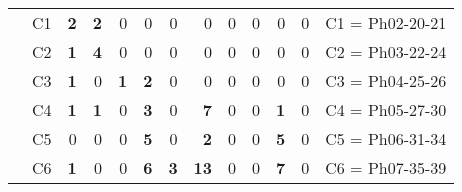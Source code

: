 \begin{table}[H]
{\begin{tabular}{|ccrrrrrrrrrrc|}
\multicolumn{1}{|c|}{}                                      & \multicolumn{1}{c|}{C1} & \multicolumn{1}{r|}{\textbf{2}} & \multicolumn{1}{r|}{\textbf{2}} & \multicolumn{1}{r|}{0}          & \multicolumn{1}{r|}{0}          & \multicolumn{1}{r|}{0}          & \multicolumn{1}{r|}{0}           & \multicolumn{1}{r|}{0}          & \multicolumn{1}{r|}{0}  & \multicolumn{1}{r|}{0}           & \multicolumn{1}{r|}{0}          & C1 = Ph02-20-21   \\ \cline{2-13}
\multicolumn{1}{|c|}{}                                      & \multicolumn{1}{c|}{C2} & \multicolumn{1}{r|}{\textbf{1}} & \multicolumn{1}{r|}{\textbf{4}} & \multicolumn{1}{r|}{0}          & \multicolumn{1}{r|}{0}          & \multicolumn{1}{r|}{0}          & \multicolumn{1}{r|}{0}           & \multicolumn{1}{r|}{0}          & \multicolumn{1}{r|}{0}  & \multicolumn{1}{r|}{0}           & \multicolumn{1}{r|}{0}          & C2 = Ph03-22-24   \\ \cline{2-13}
\multicolumn{1}{|c|}{}                                      & \multicolumn{1}{c|}{C3} & \multicolumn{1}{r|}{\textbf{1}} & \multicolumn{1}{r|}{0}          & \multicolumn{1}{r|}{\textbf{1}} & \multicolumn{1}{r|}{\textbf{2}} & \multicolumn{1}{r|}{0}          & \multicolumn{1}{r|}{0}           & \multicolumn{1}{r|}{0}          & \multicolumn{1}{r|}{0}  & \multicolumn{1}{r|}{0}           & \multicolumn{1}{r|}{0}          & C3 = Ph04-25-26   \\ \cline{2-13}
\multicolumn{1}{|c|}{}                                      & \multicolumn{1}{c|}{C4} & \multicolumn{1}{r|}{\textbf{1}} & \multicolumn{1}{r|}{\textbf{1}} & \multicolumn{1}{r|}{0}          & \multicolumn{1}{r|}{\textbf{3}} & \multicolumn{1}{r|}{0}          & \multicolumn{1}{r|}{\textbf{7}}  & \multicolumn{1}{r|}{0}          & \multicolumn{1}{r|}{0}  & \multicolumn{1}{r|}{\textbf{1}}  & \multicolumn{1}{r|}{0}          & C4 = Ph05-27-30   \\ \cline{2-13}
\multicolumn{1}{|c|}{}                                      & \multicolumn{1}{c|}{C5} & \multicolumn{1}{r|}{0}          & \multicolumn{1}{r|}{0}          & \multicolumn{1}{r|}{0}          & \multicolumn{1}{r|}{\textbf{5}} & \multicolumn{1}{r|}{0}          & \multicolumn{1}{r|}{\textbf{2}}  & \multicolumn{1}{r|}{0}          & \multicolumn{1}{r|}{0}  & \multicolumn{1}{r|}{\textbf{5}}  & \multicolumn{1}{r|}{0}          & C5 = Ph06-31-34   \\ \cline{2-13}
\multicolumn{1}{|c|}{}                                      & \multicolumn{1}{c|}{C6} & \multicolumn{1}{r|}{\textbf{1}} & \multicolumn{1}{r|}{0}          & \multicolumn{1}{r|}{0}          & \multicolumn{1}{r|}{\textbf{6}} & \multicolumn{1}{r|}{\textbf{3}} & \multicolumn{1}{r|}{\textbf{13}} & \multicolumn{1}{r|}{0}          & \multicolumn{1}{r|}{0}  & \multicolumn{1}{r|}{\textbf{7}}  & \multicolumn{1}{r|}{0}          & C6 = Ph07-35-39   \\ \cline{2-13}

\end{tabular}}
\end{table}
